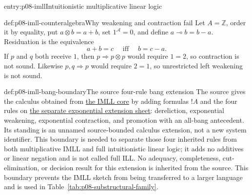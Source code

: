 \begin{systementry}{entry:p08-imll}{Intuitionistic multiplicative linear logic}
\end{systementry}

\begin{hbexample}{def:p08-imll-counteralgebra}{Why weakening and contraction fail}
Let \(A=\mathbb Z\), order it by equality, put
\(a\otimes b=a+b\), set \(1^{\mathcal A}=0\), and define
\(a\multimap b=b-a\).  Residuation is the equivalence
\[
 a+b=c\quad\text{ iff }\quad b=c-a.
\]
If \(p\) and \(q\) both receive \(1\), then
\(p\Rightarrow p\otimes p\) would require \(1=2\), so contraction is not
sound.  Likewise \(p,q\Rightarrow p\) would require \(2=1\), so unrestricted
left weakening is not sound.
\end{hbexample}

\begin{proofboundary}{def:p08-imll-bang-boundary}{The source four-rule bang extension}
The source gives the calculus obtained from
\hyperref[sheet:imll]{the IMLL core} by adding formulas \(!A\) and the four
rules on \hyperref[sheet:ill-exponential-extension]{the separate exponential
extension sheet}: dereliction, exponential weakening, exponential contraction,
and promotion with an all-bang antecedent.  Its standing is an unnamed
source-bounded calculus extension, not a new system identifier.  This boundary
is needed to separate those four inherited rules from both multiplicative IMLL
and full intuitionistic linear logic; it adds no
additives or linear negation and is not called full ILL.  No adequacy,
completeness, cut-elimination, or decision result for this extension is
inherited from the source.  This boundary prevents the IMLL sketch from being
transferred to a larger language and is used in
Table~\ref{tab:p08-substructural-family}.
\end{proofboundary}

